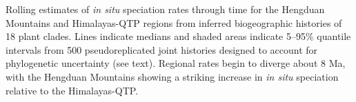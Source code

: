 \label{fig:speciation}
Rolling estimates of \textit{in situ} speciation rates through time for the Hengduan Mountains and Himalayas-QTP regions from inferred biogeographic histories of 18 plant clades. Lines indicate medians and shaded areas indicate 5--95\% quantile intervals from 500 pseudoreplicated joint histories designed to account for phylogenetic uncertainty (see text). Regional rates begin to diverge about 8 Ma, with the Hengduan Mountains showing a striking increase in \textit{in situ} speciation relative to the Himalayas-QTP.